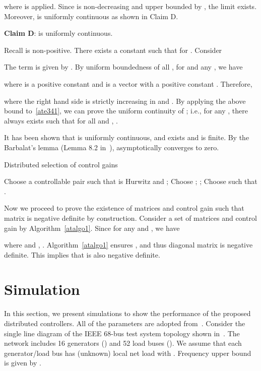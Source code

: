 \documentclass[journal]{IEEEtran}
\newcommand\oprocendsymbol{\hbox{}}
\newcommand\oprocend{\relax\ifmmode\else\unskip\hfill\fi\oprocendsymbol}
\begin{document}
where  is applied.
Since  is non-decreasing and upper bounded by , the limit  exists.
Moreover,  is uniformly continuous as shown in Claim D.

\textbf{Claim D}:  is uniformly continuous.
\begin{IEEEproof}
Recall  is non-positive. There exists a constant  such that  for . Consider

The term  is given by . By uniform boundedness of all , for  and any , we have

where  is a positive constant and  is a vector with a positive constant .
Therefore,

where the right hand side is strictly increasing in  and
.
By applying the above bound to~\eqref{ate341}, we can prove the uniform continuity of ; i.e., for any , there always exists  such that for all  and , .
\end{IEEEproof}
It has been shown that  is uniformly continuous, and 
 exists and is finite. By the Barbalat's lemma (Lemma 8.2 in~\cite{Khalil:02}),  asymptotically converges to zero.


\begin{algorithm}[t] \caption{Distributed selection of control gains}
\begin{algorithmic}[1]
\FOR{}
\STATE Choose a controllable pair  such that  is Hurwitz and ;
\STATE Choose ;
\STATE ;
\STATE Choose  such that .
\ENDFOR
\end{algorithmic}
\label{atalgo1}
\end{algorithm}
Now we proceed to prove the existence of matrices and control gain such that matrix  is negative definite by construction.
Consider a set of matrices and control gain by Algorithm~\ref{atalgo1}.
Since  for any  and , we have 

where  and
,
.
Algorithm~\ref{atalgo1} ensures , and thus diagonal matrix  is negative definite. This implies that  is also negative definite.
\oprocend

\section{Simulation}\label{sec:sim}
In this section, we present simulations to show the performance of the proposed distributed controllers.
All of the parameters are adopted from~\cite{Alvarado.Meng.ea:01,Kundar.Balu.Lauby:94}.
Consider the single line diagram of the IEEE 68-bus test system topology shown in~\cite{pal2006robust,rogers2012power}.
The network includes 16 generators () and 52 load buses (). We assume that each generator/load bus  has (unknown) local net load  with . Frequency upper bound is given by .
\end{document}
